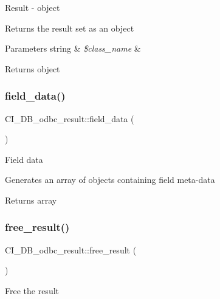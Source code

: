 Result -\/ object

Returns the result set as an object


\begin{DoxyParams}[1]{Parameters}
string & {\em \$class\+\_\+name} & \\
\hline
\end{DoxyParams}
\begin{DoxyReturn}{Returns}
object 
\end{DoxyReturn}
\mbox{\label{class_c_i___d_b__odbc__result_a140a2f2b2edc953520d5309fa402d549}} 
\subsubsection{\texorpdfstring{field\+\_\+data()}{field\_data()}}
{\footnotesize\ttfamily C\+I\+\_\+\+D\+B\+\_\+odbc\+\_\+result\+::field\+\_\+data (\begin{DoxyParamCaption}{ }\end{DoxyParamCaption})}

Field data

Generates an array of objects containing field meta-\/data

\begin{DoxyReturn}{Returns}
array 
\end{DoxyReturn}
\mbox{\label{class_c_i___d_b__odbc__result_a6b82acd7ef132185720902d30d055bdd}} 
\subsubsection{\texorpdfstring{free\+\_\+result()}{free\_result()}}
{\footnotesize\ttfamily C\+I\+\_\+\+D\+B\+\_\+odbc\+\_\+result\+::free\+\_\+result (\begin{DoxyParamCaption}{ }\end{DoxyParamCaption})}

Free the result

